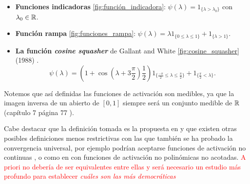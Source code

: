 \begin{definicion}
\begin{itemize}
        \item \textbf{Funciones indicadoras} \ref{fig:función_indicadora}: $\psi(\lambda) = 1_{\{\lambda > \lambda_0\}}$ con $\lambda_0 \in \mathbb{R}$. 
        \item \textbf{Función rampa} \ref{fig:funciones_rampa}: $\psi(\lambda)  = \lambda 1_{\{0 \leq \lambda \leq  1\}} + 1_{\{\lambda > 1\}}.$
    
        \item \textbf{La función \textit{cosine squasher}} de Gallant and White 
        \ref{fig:cosine_squasher} (1988) \cite{Gallant88thereexists}. 
        \begin{equation*}
    \psi(\lambda )= \left(1 + \cos\left(\lambda + 3 \frac{\pi}{2} \right) \frac{1}{2}\right) 
     1_{\{\frac{-\pi}{2} \leq \lambda \leq  \frac{\pi}{2}\}}
     +
     1_{\{ \frac{\pi}{2} < \lambda \}}.
    \end{equation*}
    \end{itemize}

   Notemos que así definidas las funciones de activación son medibles, ya que la imagen inversa de un abierto de $[0,1]$ siempre será un conjunto medible de  $\mathbb{R}$  (capítulo 7  página 77 \cite{nla.cat-vn1819421}).
    

    Cabe destacar que la definición tomada es la propuesta en \cite{HORNIK1989359} y que existen
    otras posibles definiciones menos restrictivas con las que también se ha probado la convergencia universal,
    por ejemplo podrían aceptarse funciones de activación no continuas \cite{FUNAHASHI1989183},  
    o como 
    en \cite{DBLP:journals/corr/SonodaM15} con funciones de activación no polinómicas no acotadas. 
    \textcolor{red}{A priori no debería de ser equivalentes entre ellas y será necesario un estudio más 
    profundo para establecer \textit{cuáles son las más democráticas}}

\end{definicion}



